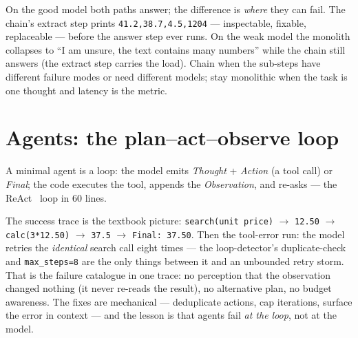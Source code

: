 



\begin{example}
\label{ex:chain}
On the good model both paths answer; the difference is \emph{where}
they can fail. The chain's extract step prints
\texttt{41.2,38.7,4.5,1204} --- inspectable, fixable, replaceable ---
before the answer step ever runs. On the weak model the monolith
collapses to ``I am unsure, the text contains many numbers'' while
the chain still answers (the extract step carries the load). Chain
when the sub-steps have different failure modes or need different
models; stay monolithic when the task is one thought and latency is
the metric.
\end{example}

\section{Agents: the plan--act--observe loop}
\label{sec:react}

A minimal agent is a loop: the model emits \emph{Thought} +
\emph{Action} (a tool call) or \emph{Final}; the code executes the
tool, appends the \emph{Observation}, and re-asks --- the
ReAct~\cite{react} loop in 60 lines.





\begin{example}
\label{ex:react}
The success trace is the textbook picture:
\texttt{search(unit price)} $\to$ \texttt{12.50} $\to$
\texttt{calc(3*12.50)} $\to$ \texttt{37.5} $\to$ \texttt{Final: 37.50}.
Then the tool-error run: the model retries the \emph{identical}
search call eight times --- the loop-detector's duplicate-check and
\texttt{max\_steps=8} are the only things between it and an unbounded
retry storm. That is the failure catalogue in one trace: no
perception that the observation changed nothing (it never re-reads
the result), no alternative plan, no budget awareness. The fixes are
mechanical --- deduplicate actions, cap iterations, surface the error
in context --- and the lesson is that agents fail \emph{at the loop},
not at the model.
\end{example}


